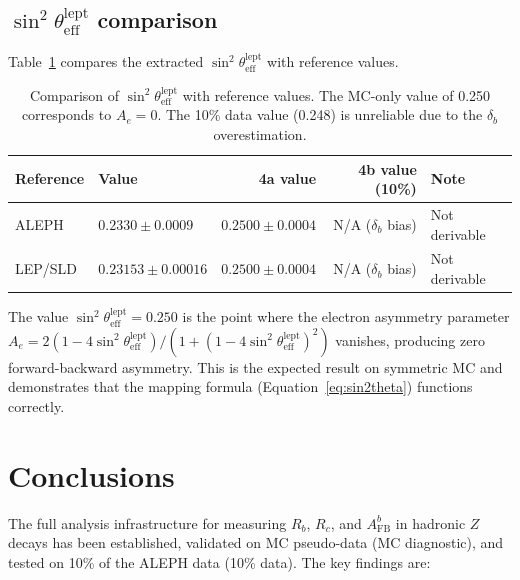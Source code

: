 \documentclass[11pt,a4paper]{article}
\begin{document}
\subsection{$\sin^2\theta_\mathrm{eff}^\mathrm{lept}$ comparison}
\label{sec:sin2theta_comparison}

Table~\ref{tab:sin2theta_comparison} compares the extracted $\sin^2\theta_\mathrm{eff}^\mathrm{lept}$
with reference values.

\begin{table}[htbp]
\centering
\caption{Comparison of $\sin^2\theta_\mathrm{eff}^\mathrm{lept}$ with reference values.
The MC-only value of 0.250 corresponds to $A_e = 0$. The 10\% data value (0.248) is
unreliable due to the $\delta_b$ overestimation.}
\label{tab:sin2theta_comparison}
\begin{tabular}{llrrl}
\toprule
Reference & Value & 4a value & 4b value (10\%) & Note \\
\midrule
ALEPH~\cite{ALEPH:AFBb} & $0.2330 \pm 0.0009$ & $0.2500 \pm 0.0004$ & N/A ($\delta_b$ bias) & Not derivable \\
LEP/SLD~\cite{LEP:EWWG:2005} & $0.23153 \pm 0.00016$ & $0.2500 \pm 0.0004$ & N/A ($\delta_b$ bias) & Not derivable \\
\bottomrule
\end{tabular}
\end{table}

The value $\sin^2\theta_\mathrm{eff}^\mathrm{lept} = 0.250$ is the point where
the electron asymmetry parameter $A_e = 2(1 - 4\sin^2\theta_\mathrm{eff}^\mathrm{lept})/
(1 + (1 - 4\sin^2\theta_\mathrm{eff}^\mathrm{lept})^2)$ vanishes, producing zero
forward-backward asymmetry. This is the expected result on symmetric MC and demonstrates
that the mapping formula (Equation~\ref{eq:sin2theta}) functions correctly.

\FloatBarrier
{}
\section{Conclusions}
\label{sec:conclusions}

The full analysis infrastructure for measuring $R_b$, $R_c$, and $A_\mathrm{FB}^b$ in
hadronic $Z$ decays has been established, validated on MC pseudo-data (MC diagnostic), and
tested on 10\% of the ALEPH data (10\% data). The key findings are:
\end{document}
